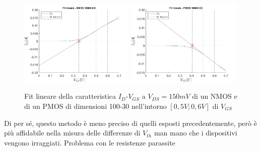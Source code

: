 \documentclass[12pt, letterpaper]{book}
\begin{document}
\begin{figure}[h!]
  \centering
  \includegraphics[width=0.49\textwidth]{LinearFit-N4-100-30}
  \includegraphics[width=0.49\textwidth]{LinearFit-P1-100-30}
  \caption{Fit lineare della caratteristica  $I_D$-$V_{GS}$ a $V_{DS}=150mV$ di un NMOS e di un PMOS di dimensioni 100-30 nell'intorno $[0,5V ; 0,6V]$ di $V_{GS}$}
\end{figure}

Di per sé, questo metodo è meno preciso di quelli esposti precedentemente, però è più affidabile nella misura delle differenze di $V_{th}$ man mano che i dispositivi vengono irraggiati. Problema con le resistenze parassite
\end{document}
